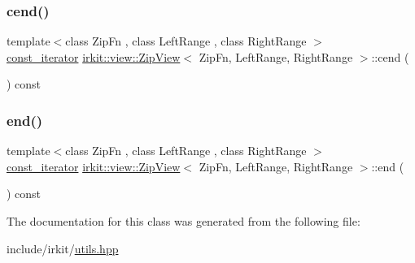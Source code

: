 \mbox{\label{classirkit_1_1view_1_1ZipView_a5ba1f0456da3ffc049e59418b4a01a3f}} 
\subsubsection{\texorpdfstring{cend()}{cend()}}
{\footnotesize\ttfamily template$<$class Zip\+Fn , class Left\+Range , class Right\+Range $>$ \\
\hyperlink{classirkit_1_1view_1_1ZipView_1_1const__iterator}{const\+\_\+iterator} \hyperlink{classirkit_1_1view_1_1ZipView}{irkit\+::view\+::\+Zip\+View}$<$ Zip\+Fn, Left\+Range, Right\+Range $>$\+::cend (\begin{DoxyParamCaption}{ }\end{DoxyParamCaption}) const\hspace{0.3cm}{\ttfamily [inline]}}

\mbox{\label{classirkit_1_1view_1_1ZipView_ab8a193bad7c33b93367014f32e9cf360}} 
\subsubsection{\texorpdfstring{end()}{end()}}
{\footnotesize\ttfamily template$<$class Zip\+Fn , class Left\+Range , class Right\+Range $>$ \\
\hyperlink{classirkit_1_1view_1_1ZipView_1_1const__iterator}{const\+\_\+iterator} \hyperlink{classirkit_1_1view_1_1ZipView}{irkit\+::view\+::\+Zip\+View}$<$ Zip\+Fn, Left\+Range, Right\+Range $>$\+::end (\begin{DoxyParamCaption}{ }\end{DoxyParamCaption}) const\hspace{0.3cm}{\ttfamily [inline]}}



The documentation for this class was generated from the following file\+:\begin{DoxyCompactItemize}
\item 
include/irkit/\hyperlink{utils_8hpp}{utils.\+hpp}\end{DoxyCompactItemize}
